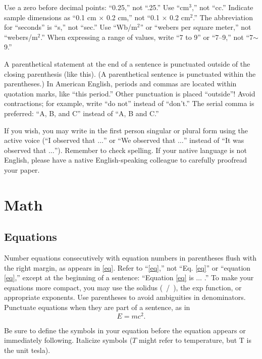 \documentclass[journal,twoside,web]{ieeecolor}
\begin{document}
Use a zero before decimal points: ``0.25,'' not ``.25.'' Use 
``cm$^{3}$,'' not ``cc.'' Indicate sample dimensions as ``0.1 cm 
$\times $ 0.2 cm,'' not ``0.1 $\times $ 0.2 cm$^{2}$.'' The 
abbreviation for ``seconds'' is ``s,'' not ``sec.'' Use 
``Wb/m$^{2}$'' or ``webers per square meter,'' not 
``webers/m$^{2}$.'' When expressing a range of values, write ``7 to 
9'' or ``7--9,'' not ``7$\sim $9.''

A parenthetical statement at the end of a sentence is punctuated outside of 
the closing parenthesis (like this). (A parenthetical sentence is punctuated 
within the parentheses.) In American English, periods and commas are located within 
quotation marks, like ``this period.'' Other punctuation is placed ``outside''! 
Avoid contractions; for example, write ``do not'' instead of ``don't.'' The 
serial comma is preferred: ``A, B, and C'' instead of ``A, B and C.''

If you wish, you may write in the first person singular or plural form using
the active voice (``I observed that $\ldots$'' or ``We observed that $\ldots$'' 
instead of ``It was observed that $\ldots$''). Remember to check spelling. If 
your native language is not English, please have a native English-speaking 
colleague to carefully proofread your paper.

\section{Math}
\subsection{Equations}
Number equations consecutively with equation numbers in parentheses flush 
with the right margin, as appears in \eqref{eq}. Refer to ``\eqref{eq},'' not ``Eq. \eqref{eq}'' 
or ``equation \eqref{eq},'' except at the beginning of a sentence: ``Equation \eqref{eq} 
is $\ldots$ .'' To make your equations more 
compact, you may use the solidus (~/~), the exp function, or appropriate 
exponents. Use parentheses to avoid ambiguities in denominators. Punctuate 
equations when they are part of a sentence, as in
\begin{equation}E=mc^2.\label{eq}\end{equation}

Be sure to define the symbols in your equation before the equation appears or
immediately following. Italicize symbols ($T$ might refer 
to temperature, but T is the unit tesla).
\end{document}
